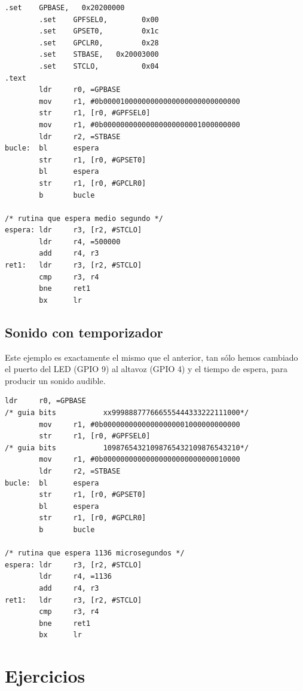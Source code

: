 \begin{lstlisting}[caption={esbn5.s},label={lst:codigoPract4_5}]
        .set    GPBASE,   0x20200000
        .set    GPFSEL0,        0x00
        .set    GPSET0,         0x1c
        .set    GPCLR0,         0x28
        .set    STBASE,   0x20003000
        .set    STCLO,          0x04
.text
        ldr     r0, =GPBASE
        mov     r1, #0b00001000000000000000000000000000
        str     r1, [r0, #GPFSEL0]
        mov     r1, #0b00000000000000000000001000000000
        ldr     r2, =STBASE
bucle:  bl      espera
        str     r1, [r0, #GPSET0]
        bl      espera
        str     r1, [r0, #GPCLR0]
        b       bucle

/* rutina que espera medio segundo */
espera: ldr     r3, [r2, #STCLO]
        ldr     r4, =500000
        add     r4, r3
ret1:   ldr     r3, [r2, #STCLO]
        cmp     r3, r4
        bne     ret1
        bx      lr
\end{lstlisting}

\subsection{Sonido con temporizador}

Este ejemplo es exactamente el mismo que el anterior, tan sólo hemos
cambiado el puerto del LED (GPIO 9) al altavoz (GPIO 4) y el tiempo de espera,
para producir un sonido audible.

\begin{lstlisting}[caption={Parte de esbn6.s},label={lst:codigoPract4_6}]
        ldr     r0, =GPBASE
/* guia bits           xx999888777666555444333222111000*/
        mov     r1, #0b00000000000000000001000000000000
        str     r1, [r0, #GPFSEL0]
/* guia bits           10987654321098765432109876543210*/
        mov     r1, #0b00000000000000000000000000010000
        ldr     r2, =STBASE
bucle:  bl      espera
        str     r1, [r0, #GPSET0]
        bl      espera
        str     r1, [r0, #GPCLR0]
        b       bucle

/* rutina que espera 1136 microsegundos */
espera: ldr     r3, [r2, #STCLO]
        ldr     r4, =1136
        add     r4, r3
ret1:   ldr     r3, [r2, #STCLO]
        cmp     r3, r4
        bne     ret1
        bx      lr
\end{lstlisting}

\section{Ejercicios}

